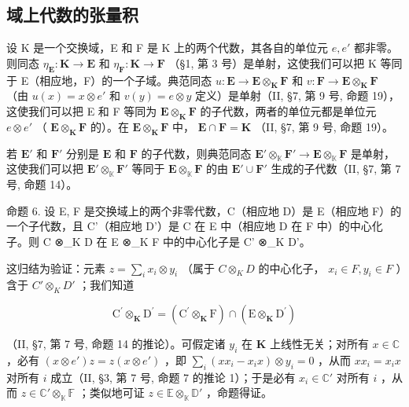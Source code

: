 \subsection{域上代数的张量积}

设 K 是一个交换域，E 和 F 是 K 上的两个代数，其各自的单位元 \(e, e'\) 都非零。则同态 \(\eta_{\mathbf{E}}: \mathbf{K} \to \mathbf{E}\) 和 \(\eta_{\mathbf{F}}: \mathbf{K} \to \mathbf{F}\) （§1, 第 3 号）是单射，这使我们可以把 K 等同于 E（相应地，F）的一个子域。典范同态 \(u: \mathbf{E} \to \mathbf{E} \otimes_{\mathbf{K}} \mathbf{F}\) 和 \(v: \mathbf{F} \to \mathbf{E} \otimes_{\mathbf{K}} \mathbf{F}\) （由 \(u(x) = x \otimes e'\) 和 \(v(y) = e \otimes y\) 定义）是单射（II, §7, 第 9 号, 命题 19），这使我们可以把 E 和 F 等同为 \(\mathbf{E} \otimes_{\mathbf{K}} \mathbf{F}\) 的子代数，两者的单位元都是单位元 \(e \otimes e'\) （ \(\mathbf{E} \otimes_{\mathbf{K}} \mathbf{F}\) 的）。在 \(\mathbf{E} \otimes_{\mathbf{K}} \mathbf{F}\) 中， \(\mathbf{E} \cap \mathbf{F} = \mathbf{K}\) （II, §7, 第 9 号, 命题 19）。

若 \(\mathbf{E}'\) 和 \(\mathbf{F}'\) 分别是 \(\mathbf{E}\) 和 \(\mathbf{F}\) 的子代数，则典范同态 \(\mathbf{E}' \otimes_{\mathbb{K}} \mathbf{F}' \to \mathbf{E} \otimes_{\mathbb{K}} \mathbf{F}\) 是单射，这使我们可以把 \(\mathbf{E}' \otimes_{\mathbb{K}} \mathbf{F}'\) 等同于 \(\mathbf{E} \otimes_{\mathbb{K}} \mathbf{F}\) 的由 \(\mathbf{E}' \cup \mathbf{F}'\) 生成的子代数（II, §7, 第 7 号, 命题 14）。

命题 6. 设 E, F 是交换域上的两个非零代数，C（相应地 D）是 E（相应地 F）的一个子代数，且 C'（相应地 D'）是 C 在 E 中（相应地 D 在 F 中）的中心化子。则 C ⊗\_K D 在 E ⊗\_K F 中的中心化子是 C' ⊗\_K D'。

这归结为验证：元素 \(z = \sum_{i} x_{i} \otimes y_{i}\) （属于 \(C \otimes_{K} D\) 的中心化子， \(x_{i} \in F, y_{i} \in F\) ）含于 \(C' \otimes_{K} D'\) ；我们知道

\[
\mathrm{C} ^ {\prime} \otimes_ {\mathbf {K}} \mathrm{D} ^ {\prime} = (\mathrm{C} ^ {\prime} \otimes_ {\mathbf {K}} \mathrm{F}) \cap (\mathrm{E} \otimes_ {\mathbf {K}} \mathrm{D} ^ {\prime})
\]

（II, §7, 第 7 号, 命题 14 的推论）。可假定诸 \(y_{i}\) 在 \(\mathbf{K}\) 上线性无关；对所有 \(x \in \mathbb{C}\) ，必有 \((x \otimes e')z = z(x \otimes e')\) ，即 \(\sum_{i} (xx_{i} - x_{i}x) \otimes y_{i} = 0\) ，从而 \(xx_{i} = x_{i}x\) 对所有 \(i\) 成立（II, §3, 第 7 号, 命题 7 的推论 1）；于是必有 \(x_{i} \in \mathbb{C}'\) 对所有 \(i\) ，从而 \(z \in \mathbb{C}' \otimes_{\mathbb{K}} \mathbb{F}\) ；类似地可证 \(z \in \mathbb{E} \otimes_{\mathbb{K}} \mathbb{D}'\) ，命题得证。

